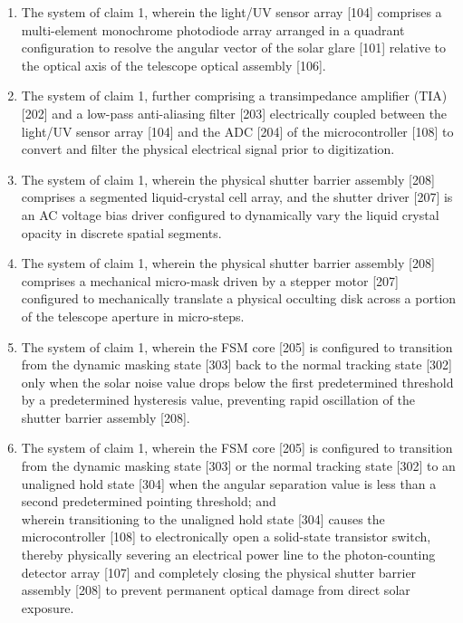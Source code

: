 \documentclass[12pt,a4paper]{article}
\begin{document}
\begin{enumerate}
    \item The system of claim 1, wherein the light/UV sensor array [104] comprises a multi-element monochrome photodiode array arranged in a quadrant configuration to resolve the angular vector of the solar glare [101] relative to the optical axis of the telescope optical assembly [106].

    \item The system of claim 1, further comprising a transimpedance amplifier (TIA) [202] and a low-pass anti-aliasing filter [203] electrically coupled between the light/UV sensor array [104] and the ADC [204] of the microcontroller [108] to convert and filter the physical electrical signal prior to digitization.

    \item The system of claim 1, wherein the physical shutter barrier assembly [208] comprises a segmented liquid-crystal cell array, and the shutter driver [207] is an AC voltage bias driver configured to dynamically vary the liquid crystal opacity in discrete spatial segments.

    \item The system of claim 1, wherein the physical shutter barrier assembly [208] comprises a mechanical micro-mask driven by a stepper motor [207] configured to mechanically translate a physical occulting disk across a portion of the telescope aperture in micro-steps.

    \item The system of claim 1, wherein the FSM core [205] is configured to transition from the dynamic masking state [303] back to the normal tracking state [302] only when the solar noise value drops below the first predetermined threshold by a predetermined hysteresis value, preventing rapid oscillation of the shutter barrier assembly [208].

    \item The system of claim 1, wherein the FSM core [205] is configured to transition from the dynamic masking state [303] or the normal tracking state [302] to an unaligned hold state [304] when the angular separation value is less than a second predetermined pointing threshold; and \\
    wherein transitioning to the unaligned hold state [304] causes the microcontroller [108] to electronically open a solid-state transistor switch, thereby physically severing an electrical power line to the photon-counting detector array [107] and completely closing the physical shutter barrier assembly [208] to prevent permanent optical damage from direct solar exposure.


\end{enumerate}
\end{document}
